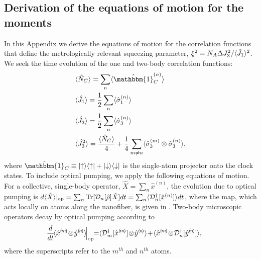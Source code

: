 \documentclass[aps,pra,twocolumn]{revtex4-1} %
\begin{document}
\begin{appendix}
\section{Derivation of the equations of motion for the moments} \label{Appendix::OpticalPumping}	

In this Appendix we derive the equations of motion for the correlation functions that define the metrologically relevant squeezing parameter, $\xi^2 = N_A \Delta J_3^2/\langle{\hat{J}_1}\rangle^2$.  
We seek the time evolution of the one and two-body correlation functions:
\begin{subequations}
\begin{align}
&\expt{\hat{N}_C} = \sum_n \expt{\hat{\mathbbm{1}}^{(n)}_C} \\
&\expt{\hat{J}_1} = \frac{1}{2} \sum_n \expt{\hat{\sigma}_1^{(n)}} \\
&\expt{\hat{J}_3} = \frac{1}{2} \sum_n \expt{\hat{\sigma}_3^{(n)}} \\
&\expt{\hat{J}_3^2} = \frac{\expt{\hat{N}_C}}{4} +\frac{1}{4} \sum_{m \neq n} \expt{\hat{\sigma}_3^{(m)}\otimes \hat{\sigma}_3^{(n)}}, 
\end{align}
\end{subequations}
where $\hat{\mathbbm{1}}_C \equiv \op{\uparrow}{\uparrow} + \op{\downarrow}{\downarrow}$ is the single-atom projector onto the clock states. 
To include optical pumping, we apply the following equations of motion. For a collective, single-body operator, $\hat{X} = \sum_n \hat{x}^{(n)}$, the evolution due to optical pumping is $d\langle{ \hat{X}}\rangle|_{\rm op} = \sum_n \mbox{Tr} [\mathcal{D}_n[\hat{\rho}]\hat{X} ]dt = \sum_n \langle{\mathcal{D}_n^\dagger[\hat{x}^{(n)}]}\rangle dt$, where the map, which acts locally on atoms along the nanofiber, is given in .  
Two-body microscopic operators decay by optical pumping according to \cite{baragiola_three-dimensional_2014}
	\begin{align} \label{Eq::TwoBodyDecay}
		\!\!\!\!\!\frac{d}{dt}\! \expt{ \hat{x}^{(\!m\!)} \!\otimes\! \hat{y}^{(\!n\!)} } \!\Big|_{\rm op} \!\!= &\expt{ \mathcal{D}_m\dg[ \hat{x}^{(\!m\!)}] \!\otimes\! \hat{y}^{(\!n\!)} } \!+\! \expt{ \hat{x}^{(\!m\!)}\!\otimes\! \mathcal{D}_n\dg[ \hat{y}^{(\!n\!)}] },
	\end{align}
where the superscripts refer to the $m^{th}$ and $n^{th}$ atoms. 


\end{appendix}
\end{document}
